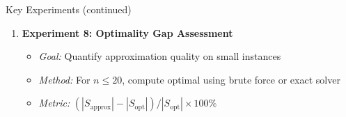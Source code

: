 \documentclass[aspectratio=169]{beamer}
\begin{document}
\begin{frame}{Key Experiments (continued)}
\begin{enumerate}
		      \vspace{0.2cm}
		\item \textbf{Experiment 8: Optimality Gap Assessment}
		      \begin{itemize}
			      \scriptsize
			      \item \textit{Goal:} Quantify approximation quality on small instances
			      \item \textit{Method:} For $n \leq 20$, compute optimal using brute force or exact solver
			      \item \textit{Metric:} $(|S_{\text{approx}}| - |S_{\text{opt}}|) / |S_{\text{opt}}| \times 100\%$
		      \end{itemize}
	\end{enumerate}
\end{frame}
\end{document}
